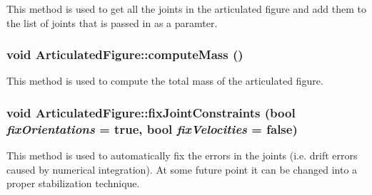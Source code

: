 This method is used to get all the joints in the articulated figure and add them to the list of joints that is passed in as a paramter. \hypertarget{classCartWheel_1_1Physics_1_1ArticulatedFigure_a6a60bc90cdc670b6d8f6dca4dfd801af}{
\subsubsection[{computeMass}]{\setlength{\rightskip}{0pt plus 5cm}void ArticulatedFigure::computeMass ()}}
\label{classCartWheel_1_1Physics_1_1ArticulatedFigure_a6a60bc90cdc670b6d8f6dca4dfd801af}
This method is used to compute the total mass of the articulated figure. \hypertarget{classCartWheel_1_1Physics_1_1ArticulatedFigure_aba291c1bb8d97e47f7cd3d5ebd36dc10}{
\subsubsection[{fixJointConstraints}]{\setlength{\rightskip}{0pt plus 5cm}void ArticulatedFigure::fixJointConstraints (bool {\em fixOrientations} = {\ttfamily true}, \/  bool {\em fixVelocities} = {\ttfamily false})}}
\label{classCartWheel_1_1Physics_1_1ArticulatedFigure_aba291c1bb8d97e47f7cd3d5ebd36dc10}
This method is used to automatically fix the errors in the joints (i.e. drift errors caused by numerical integration). At some future point it can be changed into a proper stabilization technique.

